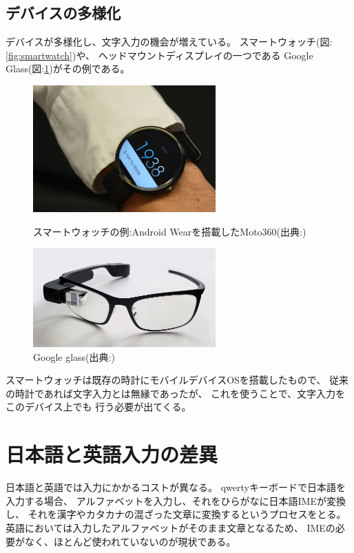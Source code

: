 \subsection{デバイスの多様化}
デバイスが多様化し、文字入力の機会が増えている。
スマートウォッチ(図:\ref{fig:smartwatch})や、
ヘッドマウントディスプレイの一つである
Google Glass(図:\ref{fig:googleglass})がその例である。
\begin{figure}[htbp]
  \begin{minipage}{0.5\hsize}
    \begin{center}
      \includegraphics[width=70mm,bb=0 0 246 171]{images/smartwatch.png}
    \end{center}
    \caption{スマートウォッチの例:Android Wearを搭載したMoto360(出典:\cite{smartwatch})}
    \label{fig:smartwatch}
  \end{minipage}
  \begin{minipage}{0.5\hsize}
    \begin{center}
      \includegraphics[width=70mm,bb=0 0 1280 697]{images/googleglass.png}
    \end{center}
    \caption{Google glass(出典:\cite{googleglass})}
    \label{fig:googleglass}
  \end{minipage}
\end{figure}
スマートウォッチは既存の時計にモバイルデバイスOSを搭載したもので、
従来の時計であれば文字入力とは無縁であったが、
これを使うことで、文字入力をこのデバイス上でも
行う必要が出てくる。

\section{日本語と英語入力の差異}
日本語と英語では入力にかかるコストが異なる。
qwertyキーボードで日本語を入力する場合、
アルファベットを入力し、それをひらがなに日本語IMEが変換し、
それを漢字やカタカナの混ざった文章に変換するというプロセスをとる。
英語においては入力したアルファベットがそのまま文章となるため、
IMEの必要がなく、ほとんど使われていないのが現状である。

